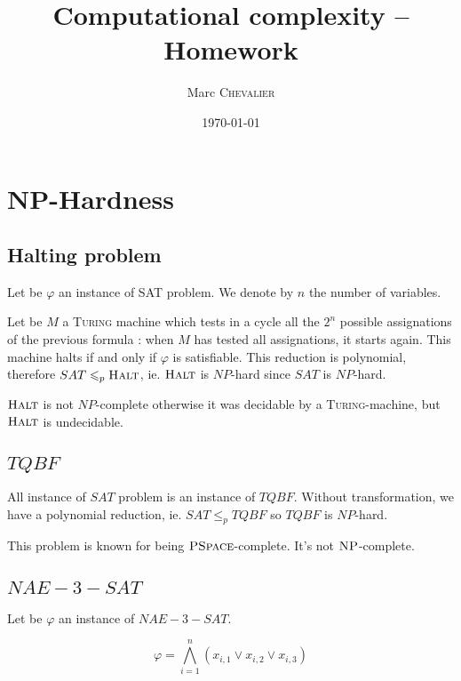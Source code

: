 

\author{
    Marc \textsc{Chevalier}
}
\date{\today}
\title{Computational complexity \--- Homework}



\maketitle

\section{NP-Hardness}
\subsection{Halting problem}

Let be $\varphi$ an instance of SAT problem. We denote by $n$ the number of variables.

Let be $M$ a \textsc{Turing} machine which tests in a cycle all the $2^n$ possible assignations of the previous formula : when $M$ has tested all assignations, it starts again. This machine halts if and only if $\varphi$ is satisfiable. This reduction is polynomial, therefore $SAT \leqslant_p \textsc{Halt}$, ie. $\textsc{Halt}$ is $NP$-hard since $SAT$ is $NP$-hard.

$\textsc{Halt}$ is not $NP$-complete otherwise it was decidable by a \textsc{Turing}-machine, but $\textsc{Halt}$ is undecidable.

\subsection{\texorpdfstring{$TQBF$}{TQBF}}

All instance of $SAT$ problem is an instance of $TQBF$. Without transformation, we have a polynomial reduction, ie. $SAT\leqslant_p TQBF$ so $TQBF$ is $NP$-hard.

This problem is known for being $\textsc{PSpace}$-complete. It's not $\textsc{NP}$-complete.
   
\subsection{\texorpdfstring{$NAE-3-SAT$}{NAE-3-SAT}}

Let be $\varphi$ an instance of $NAE-3-SAT$.

$$
    \varphi = \bigwedge\limits_{i=1}^n \left(x_{i,1} \vee x_{i,2} \vee x_{i,3}\right)
$$

